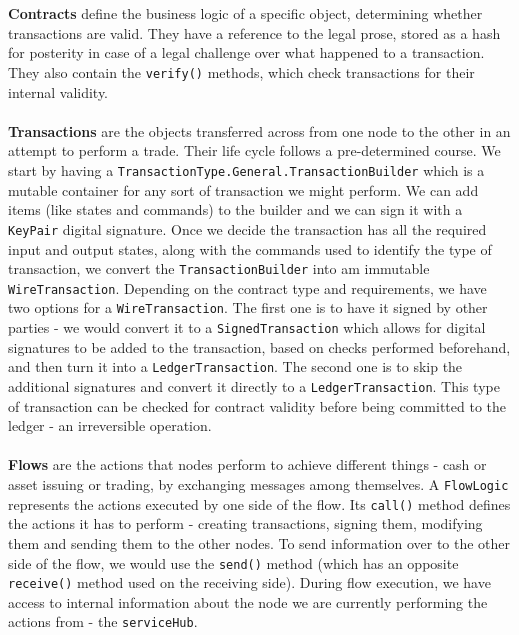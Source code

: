 \documentclass[12pt,twoside]{article}
\begin{document}
\\ \\
\textbf{Contracts} define the business logic of a specific object, determining whether transactions are valid. They have a reference to the legal prose, stored as a hash for posterity in case of a legal challenge over what happened to a transaction. They also contain the \verb|verify()| methods, which check transactions for their internal validity.
\\ \\
\textbf{Transactions} are the objects transferred across from one node to the other in an attempt to perform a trade. Their life cycle follows a pre-determined course. We start by having a \verb|TransactionType.General.TransactionBuilder| which is a mutable container for any sort of transaction we might perform. We can add items (like states and commands) to the builder and we can sign it with a \verb|KeyPair| digital signature. Once we decide the transaction has all the required input and output states, along with the commands used to identify the type of transaction, we convert the \verb|TransactionBuilder| into am immutable \verb|WireTransaction|. Depending on the contract type and requirements, we have two options for a \verb|WireTransaction|. The first one is to have it signed by other parties - we would convert it to a \verb|SignedTransaction| which allows for digital signatures to be added to the transaction, based on checks performed beforehand, and then turn it into a \verb|LedgerTransaction|. The second one is to skip the additional signatures and convert it directly to a \verb|LedgerTransaction|. This type of transaction can be checked for contract validity before being committed to the ledger - an irreversible operation.
\\ \\
\textbf{Flows} are the actions that nodes perform to achieve different things - cash or asset issuing or trading, by exchanging messages among themselves. A \verb|FlowLogic| represents the actions executed by one side of the flow. Its \verb|call()| method defines the actions it has to perform - creating transactions, signing them, modifying them and sending them to the other nodes. To send information over to the other side of the flow, we would use the \verb|send()| method (which has an opposite \verb|receive()| method used on the receiving side). During flow execution, we have access to internal information about the node we are currently performing the actions from - the \verb|serviceHub|.
\\ \\
\end{document}
